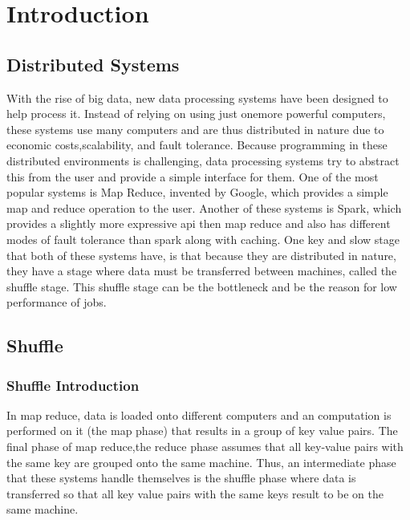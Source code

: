 \chapter{Introduction}\label{intro-ch}

\section{Distributed Systems}


With the rise of big data, new data processing systems have been designed to help process it. 
Instead of relying on using just onemore powerful computers, these systems use many computers and are thus distributed in nature due to economic costs,scalability, and fault tolerance. Because programming in these  distributed environments is challenging, data processing systems
try to abstract this from the user and provide a simple interface for them. One of the most popular systems is Map Reduce,
invented by Google, which provides a simple map and reduce operation to the user. Another of these systems is Spark, which provides
a slightly more expressive api then map reduce and also has different modes of fault tolerance than spark along with caching. 
One key and slow stage that both of these systems have, is that because they are distributed in nature, they have a stage
where data must be transferred between machines, called the shuffle stage. This shuffle stage can be the bottleneck and be the reason for low performance of jobs.
\section{Shuffle} 

\subsection{Shuffle Introduction}
In map reduce, data is loaded onto different computers and an computation is performed on it (the map phase) that results 
in a group of key value pairs. The final phase of map reduce,the reduce phase assumes that all key-value pairs with the same
key are grouped onto the same machine. Thus, an intermediate phase that these systems handle themselves is the shuffle phase where
data is transferred so that all key value pairs with the same keys result to be on the same machine. 
\\

